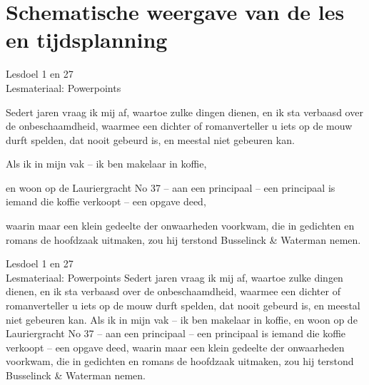 
\section{Schematische weergave van de les en tijdsplanning}
\lesschematitel
\helplesdeel

\begin{lesdeel}{
    Lesdoel 1 en 27 \\
    Lesmateriaal: Powerpoints
}
    \vspace{-3.5mm}
    \begin{schemalist}
        \item{Sedert jaren vraag ik mij af, waartoe zulke dingen dienen, en ik sta verbaasd over de onbeschaamdheid, waarmee een dichter of romanverteller u iets op de mouw durft spelden, dat nooit gebeurd is, en meestal niet gebeuren kan.}
        \item{Als ik in mijn vak -- ik ben makelaar in koffie, }
        \item{en woon op de Lauriergracht No 37 -- aan een principaal -- een principaal is iemand die koffie verkoopt -- een opgave deed, }
        \item{waarin maar een klein gedeelte der onwaarheden voorkwam, die in gedichten en romans de hoofdzaak uitmaken, zou hij terstond Busselinck \& Waterman nemen.}
    \end{schemalist}
\end{lesdeel}%


\begin{lesdeel}{
    Lesdoel 1 en 27 \\
    Lesmateriaal: Powerpoints
}
    Sedert jaren vraag ik mij af, waartoe zulke dingen dienen, en ik sta verbaasd over de onbeschaamdheid, waarmee een dichter of romanverteller u iets op de mouw durft spelden, dat nooit gebeurd is, en meestal niet gebeuren kan.
    Als ik in mijn vak -- ik ben makelaar in koffie, en woon op de Lauriergracht No 37 -- aan een principaal -- een principaal is iemand die koffie verkoopt -- een opgave deed, waarin maar een klein gedeelte der onwaarheden voorkwam, die in gedichten en romans de hoofdzaak uitmaken, zou hij terstond Busselinck \& Waterman nemen.
\end{lesdeel}%

